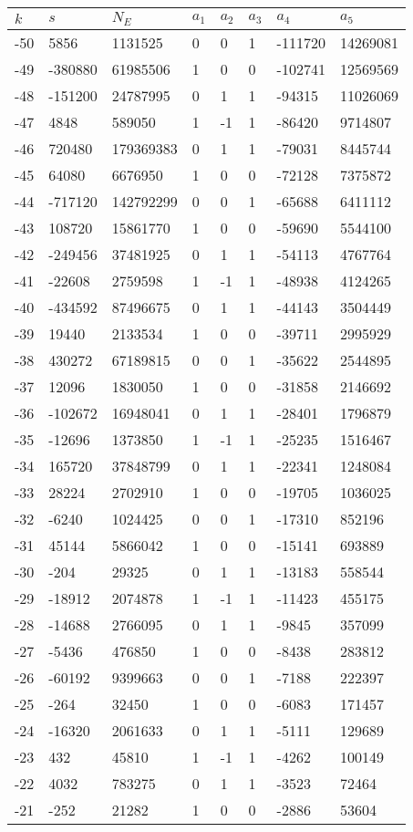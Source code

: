 \documentclass{amsart}
\begin{document}
\begin{longtable}{|l|l|l|lllll|}
\hline
$k$ & $s$ & $N_E$ & $a_1$ & $a_2$ & $a_3$ & $a_4$ & $a_5$\\
\hline
-50&5856&1131525&0&0&1&-111720&14269081\\
-49&-380880&61985506&1&0&0&-102741&12569569\\
-48&-151200&24787995&0&1&1&-94315&11026069\\
-47&4848&589050&1&-1&1&-86420&9714807\\
-46&720480&179369383&0&1&1&-79031&8445744\\
-45&64080&6676950&1&0&0&-72128&7375872\\
-44&-717120&142792299&0&0&1&-65688&6411112\\
-43&108720&15861770&1&0&0&-59690&5544100\\
-42&-249456&37481925&0&1&1&-54113&4767764\\
-41&-22608&2759598&1&-1&1&-48938&4124265\\
-40&-434592&87496675&0&1&1&-44143&3504449\\
-39&19440&2133534&1&0&0&-39711&2995929\\
-38&430272&67189815&0&0&1&-35622&2544895\\
-37&12096&1830050&1&0&0&-31858&2146692\\
-36&-102672&16948041&0&1&1&-28401&1796879\\
-35&-12696&1373850&1&-1&1&-25235&1516467\\
-34&165720&37848799&0&1&1&-22341&1248084\\
-33&28224&2702910&1&0&0&-19705&1036025\\
-32&-6240&1024425&0&0&1&-17310&852196\\
-31&45144&5866042&1&0&0&-15141&693889\\
-30&-204&29325&0&1&1&-13183&558544\\
-29&-18912&2074878&1&-1&1&-11423&455175\\
-28&-14688&2766095&0&1&1&-9845&357099\\
-27&-5436&476850&1&0&0&-8438&283812\\
-26&-60192&9399663&0&0&1&-7188&222397\\
-25&-264&32450&1&0&0&-6083&171457\\
-24&-16320&2061633&0&1&1&-5111&129689\\
-23&432&45810&1&-1&1&-4262&100149\\
-22&4032&783275&0&1&1&-3523&72464\\
-21&-252&21282&1&0&0&-2886&53604\\

\end{longtable}
\end{document}
